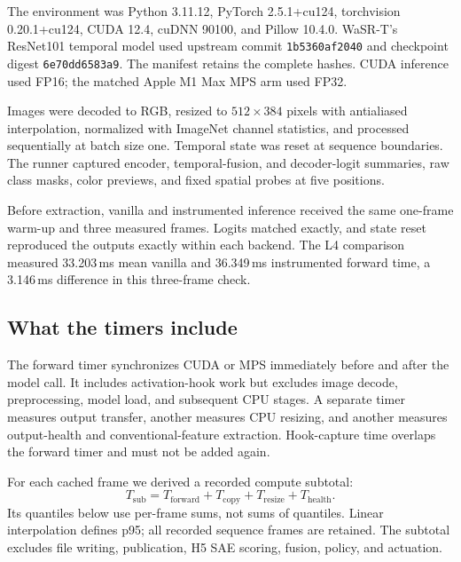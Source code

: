 \documentclass[sigconf,nonacm]{acmart}
\begin{document}
The environment was Python 3.11.12, PyTorch 2.5.1+cu124, torchvision 0.20.1+cu124, CUDA 12.4, cuDNN 90100, and Pillow 10.4.0. WaSR-T's ResNet101 temporal model used upstream commit \texttt{1b5360af2040} and checkpoint digest \texttt{6e70dd6583a9}. The manifest retains the complete hashes. CUDA inference used FP16; the matched Apple M1 Max MPS arm used FP32.

Images were decoded to RGB, resized to $512\times384$ pixels with antialiased interpolation, normalized with ImageNet channel statistics, and processed sequentially at batch size one. Temporal state was reset at sequence boundaries. The runner captured encoder, temporal-fusion, and decoder-logit summaries, raw class masks, color previews, and fixed spatial probes at five positions.

Before extraction, vanilla and instrumented inference received the same one-frame warm-up and three measured frames. Logits matched exactly, and state reset reproduced the outputs exactly within each backend. The L4 comparison measured 33.203\,ms mean vanilla and 36.349\,ms instrumented forward time, a 3.146\,ms difference in this three-frame check.

\subsection{What the timers include}
The forward timer synchronizes CUDA or MPS immediately before and after the model call. It includes activation-hook work but excludes image decode, preprocessing, model load, and subsequent CPU stages. A separate timer measures output transfer, another measures CPU resizing, and another measures output-health and conventional-feature extraction. Hook-capture time overlaps the forward timer and must not be added again.

For each cached frame we derived a recorded compute subtotal:
\[
T_{\mathrm{sub}}=T_{\mathrm{forward}}+T_{\mathrm{copy}}
                 +T_{\mathrm{resize}}+T_{\mathrm{health}}.
\]
Its quantiles below use per-frame sums, not sums of quantiles. Linear interpolation defines p95; all recorded sequence frames are retained. The subtotal excludes file writing, publication, H5 SAE scoring, fusion, policy, and actuation.
\end{document}
